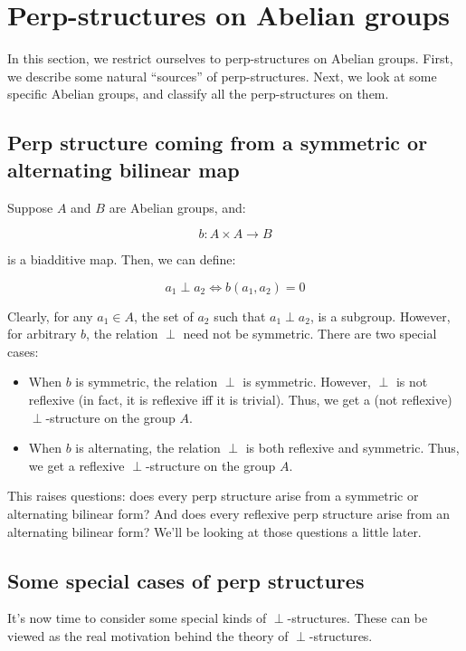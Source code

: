 \documentclass[a4paper]{amsart}
\begin{document}
\section{Perp-structures on Abelian groups}

In this section, we restrict ourselves to perp-structures on Abelian
groups. First, we describe some natural ``sources'' of
perp-structures. Next, we look at some specific Abelian groups, and
classify all the perp-structures on them.

\subsection{Perp structure coming from a symmetric or alternating bilinear map}

Suppose $A$ and $B$ are Abelian groups, and:

$$b: A \times A \to B$$

is a biadditive map. Then, we can define:

$$a_1 \perp a_2 \iff b(a_1,a_2) = 0$$

Clearly, for any $a_1 \in A$, the set of $a_2$ such that $a_1 \perp
a_2$, is a subgroup. However, for arbitrary $b$, the relation $\perp$
need not be symmetric. There are two special cases:

\begin{itemize}

\item When $b$ is symmetric, the relation $\perp$ is
  symmetric. However, $\perp$ is not reflexive (in fact, it is
  reflexive iff it is trivial). Thus, we get a (not reflexive)
  $\perp$-structure on the group $A$.

\item When $b$ is alternating, the relation $\perp$ is both reflexive
  and symmetric. Thus, we get a reflexive $\perp$-structure on the
  group $A$.

\end{itemize}

This raises questions: does every perp structure arise from a
symmetric or alternating bilinear form? And does every reflexive perp
structure arise from an alternating bilinear form? We'll be looking at
those questions a little later.

\subsection{Some special cases of perp structures}

It's now time to consider some special kinds of
$\perp$-structures. These can be viewed as the real motivation behind
the theory of $\perp$-structures.
\end{document}
